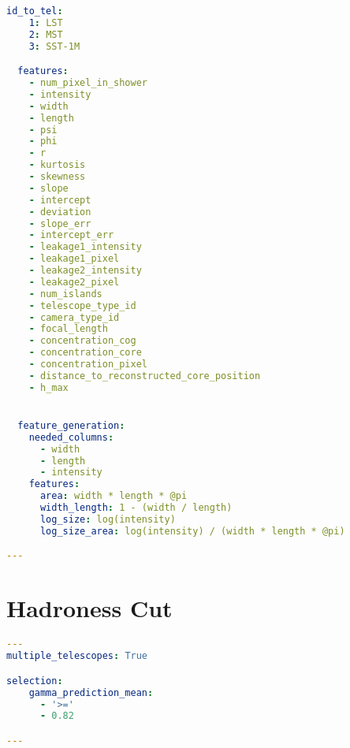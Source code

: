 \begin{lstlisting}[language=yaml]
  id_to_tel:
    1: LST
    2: MST
    3: SST-1M 

  features:
    - num_pixel_in_shower
    - intensity
    - width
    - length
    - psi
    - phi
    - r
    - kurtosis
    - skewness
    - slope
    - intercept
    - deviation
    - slope_err
    - intercept_err
    - leakage1_intensity
    - leakage1_pixel
    - leakage2_intensity
    - leakage2_pixel
    - num_islands
    - telescope_type_id
    - camera_type_id
    - focal_length
    - concentration_cog
    - concentration_core
    - concentration_pixel
    - distance_to_reconstructed_core_position
    - h_max


  feature_generation:
    needed_columns:
      - width
      - length
      - intensity
    features:
      area: width * length * @pi
      width_length: 1 - (width / length)
      log_size: log(intensity)
      log_size_area: log(intensity) / (width * length * @pi)

---
\end{lstlisting}

\section{Hadroness Cut}

\begin{lstlisting}[language=yaml]
---
multiple_telescopes: True

selection:
    gamma_prediction_mean:
      - '>='
      - 0.82

---
\end{lstlisting}
